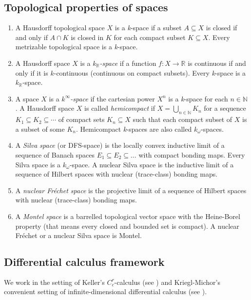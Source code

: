 \documentclass[11pt,reqno]{amsart}
\theoremstyle{definition}
\numberwithin{equation}{section}
\begin{document}
\subsection{Topological properties of spaces}
\begin{enumerate}
    \item A Hausdorff topological space $X$ is a \textit{k}-space if a subset $A \subseteq X$ is closed if and only if $A \cap K$ is closed in $K$ for each compact subset $K \subseteq X$. Every metrizable topological space is a \textit{k}-space.
    \item A Hausdorff space $X$ is a \textit{$k_{\mathbb{R}}$-space} if a function $f: X \rightarrow \mathbb{R}$ is continuous if and only if it is $k$-continuous (continuous on compact subsets). Every \textit{k}-space is a $k_{\mathbb{R}}$-space.
    \item A space $X$ is a \textit{$k^{\infty}$-space} if the cartesian power $X^{n}$ is a \textit{k}-space for each $n \in \mathbb{N}$. A Hausdorff space $X$ is called \textit{hemicompact} if $X=\bigcup_{n\in \mathbb{N}}K_n$ for a sequence $K_1\subseteq K_2\subseteq\cdots$ of compact sets $K_n\subseteq X$ such that each compact subset of $X$ is a subset of some $K_n$. Hemicompact \textit{k}-spaces are also called $k_{\omega}$-spaces.
    \item A \textit{Silva space} (or DFS-space) is the locally convex inductive limit of a sequence of Banach spaces $E_{1} \subseteq E_{2} \subseteq \dots$ with compact bonding maps. Every Silva space is a $k_{\omega}$-space. A nuclear Silva space is the inductive limit of a sequence of Hilbert spaces with nuclear (trace-class) bonding maps.
    \item A \textit{nuclear Fréchet space} is the projective limit of a sequence of Hilbert spaces with nuclear (trace-class) bonding maps.
    \item A \textit{Montel space} is a barrelled topological vector space with the Heine-Borel property (that means every closed and bounded set is compact). A nuclear Fréchet or a nuclear Silva space is Montel.
\end{enumerate}

\subsection{Differential calculus framework}
We work in the setting of Keller's $C_{c}^{r}$-calculus (see \cite{11}) and Kriegl-Michor's convenient setting of infinite-dimensional differential calculus (see \cite{20}).
\end{document}
